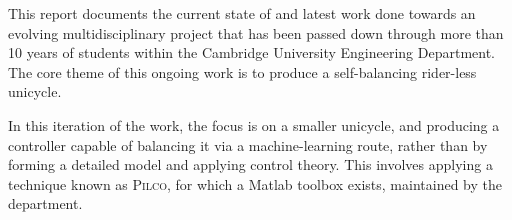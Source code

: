 \documentclass[main.tex]{subfiles}
\begin{document}
This report documents the current state of and latest work done towards an evolving multidisciplinary project that has been passed down through more than 10 years of students within the Cambridge University Engineering Department. The core theme of this ongoing work is to produce a self-balancing rider-less unicycle.

In this iteration of the work, the focus is on a smaller unicycle, and producing a controller capable of balancing it via a machine-learning route, rather than by forming a detailed model and applying control theory. This involves applying a technique known as \textsc{Pilco}, for which a Matlab toolbox exists, maintained by the department.
\end{document}
